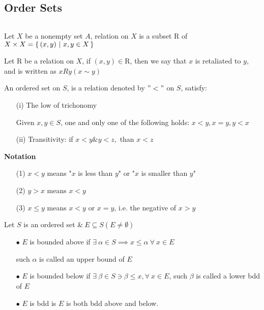 \subsection{Order Sets}

\begin{defn}[Relation]$ $


	Let $X$ be a nonempty set $A$, relation on $X$ is a subset $\mathrm{R}$ of $X \times X = \left\{ \,(x,y)~|~x,y \in X \,\right\}$
	
	Let $\mathrm{R}$ be a relation on $X$, if $(x,y) \in \mathrm{R}$, then we say that $x$ is retaliated to $y$, and is written as $xRy(x\sim y)$
\end{defn}

\begin{defn}
	An ordered set on $S$, is a relation denoted by $"<"$ on $S$, satisfy:
	
	\begin{enumerate}
		\item[(i)] The low of trichonomy
		
		Given $x,y \in S$, one and only one of the following holds: $x<y,x=y,y<x$
		
		\item[(ii)] Transitivity: if $x < y \& y < z,$ than $x<z$
	\end{enumerate} 
	
	\begin{tcolorbox}
		\textbf{Notation}
		\begin{enumerate}
			\item[(1)] $x<y$ means "$x$ is less than $y$" or "$x$ is smaller than $y$"
			\item[(2)] $y > x$ means $x<y$
			\item[(3)] $x \leq y$ means $x < y$ or $x = y$, i.e. the negative of $x > y$
		\end{enumerate}
	\end{tcolorbox}
	
	
\end{defn}



\begin{defn}
	Let $S$ is an ordered set $\&~ E \subseteq S(E \neq \emptyset)$
	
	\begin{enumerate}
		\item[$\bullet$] $E$ is bounded above if $\exists~ \alpha \in S \implies x \leq \alpha~\forall ~x \in E$
		
		such $\alpha$ is called an upper bound of $E$
		 
		\item[$\bullet$] $E$ is bounded below if $\exists~ \beta \in S \ni \beta \leq x, \forall~x\in E$, such $\beta$ is called a lower bdd of $E$
		\item[$\bullet$] $E$ is bdd is $E$ is both bdd above and below. 
	\end{enumerate}
\end{defn}

